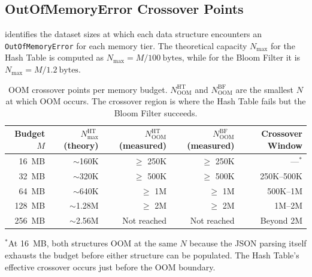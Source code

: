 \subsection{OutOfMemoryError Crossover Points}
\label{subsec:oom}

 identifies the dataset sizes at which each data structure encounters an \texttt{OutOfMemoryError} for each memory tier. The theoretical capacity $N_{\max}$ for the Hash Table is computed as $N_{\max} = M / 100~\text{bytes}$, while for the Bloom Filter it is $N_{\max} = M / 1.2~\text{bytes}$.

\begin{table}[t]
\centering
\caption{OOM crossover points per memory budget. $N_{\text{OOM}}^{\text{HT}}$ and $N_{\text{OOM}}^{\text{BF}}$ are the smallest $N$ at which OOM occurs. The crossover region is where the Hash Table fails but the Bloom Filter succeeds.}
\label{tab:oom_points}
\begin{tabular}{@{}r r r r r@{}}
\toprule
\textbf{Budget $M$} & \textbf{$N_{\max}^{\text{HT}}$ (theory)} & \textbf{$N_{\text{OOM}}^{\text{HT}}$ (measured)} & \textbf{$N_{\text{OOM}}^{\text{BF}}$ (measured)} & \textbf{Crossover Window} \\
\midrule
16~MB   & $\sim$160K    & $\geq$ 250K    & $\geq$ 250K  & ---$^{*}$         \\
32~MB   & $\sim$320K    & $\geq$ 500K    & $\geq$ 500K  & 250K--500K        \\
64~MB   & $\sim$640K    & $\geq$ 1M      & $\geq$ 1M    & 500K--1M          \\
128~MB  & $\sim$1.28M   & $\geq$ 2M      & $\geq$ 2M    & 1M--2M            \\
256~MB  & $\sim$2.56M   & Not reached    & Not reached  & Beyond 2M         \\
\bottomrule
\end{tabular}

\vspace{0.3em}
\footnotesize{$^{*}$At 16~MB, both structures OOM at the same $N$ because the JSON parsing itself exhausts the budget before either structure can be populated. The Hash Table's effective crossover occurs just before the OOM boundary.}
\end{table}


